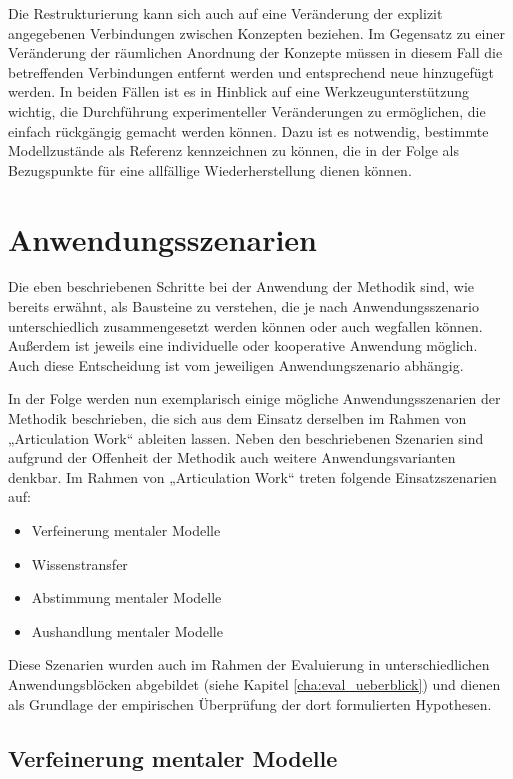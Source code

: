 Die Restrukturierung kann sich auch auf eine Veränderung der explizit angegebenen Verbindungen zwischen Konzepten beziehen. Im Gegensatz zu einer Veränderung der räumlichen Anordnung der Konzepte müssen in diesem Fall die betreffenden Verbindungen entfernt werden und entsprechend neue hinzugefügt werden. In beiden Fällen ist es in Hinblick auf eine Werkzeugunterstützung wichtig, die Durchführung experimenteller Veränderungen zu ermöglichen, die einfach rückgängig gemacht werden können. Dazu ist es notwendig, bestimmte Modellzustände als Referenz kennzeichnen zu können, die in der Folge als Bezugspunkte für eine allfällige Wiederherstellung dienen können.


\section{Anwendungsszenarien}
\label{sec:mm_anwendungsszenarien}

Die eben beschriebenen Schritte bei der Anwendung der Methodik sind, wie bereits erwähnt, als Bausteine zu verstehen, die je nach Anwendungsszenario unterschiedlich zusammengesetzt werden können oder auch wegfallen können. Außerdem ist jeweils eine individuelle oder kooperative Anwendung möglich. Auch diese Entscheidung ist vom jeweiligen Anwendungszenario abhängig.

In der Folge werden nun exemplarisch einige mögliche Anwendungsszenarien der Methodik beschrieben, die sich aus dem Einsatz derselben im Rahmen von „Articulation Work“ ableiten lassen. Neben den beschriebenen Szenarien sind aufgrund der Offenheit der Methodik auch weitere Anwendungsvarianten denkbar. Im Rahmen von „Articulation Work“ treten folgende Einsatzszenarien auf:

\begin{itemize}
 \item Verfeinerung mentaler Modelle
 \item Wissenstransfer
 \item Abstimmung mentaler Modelle 
 \item Aushandlung mentaler Modelle
\end{itemize}

Diese Szenarien wurden auch im Rahmen der Evaluierung in unterschiedlichen Anwendungsblöcken abgebildet (siehe Kapitel \ref{cha:eval_ueberblick}) und dienen als Grundlage der empirischen Überprüfung der dort formulierten Hypothesen.

\subsection{Verfeinerung mentaler Modelle} %
\label{sub:verfeinerung_individueller_mentaler_modelle}

